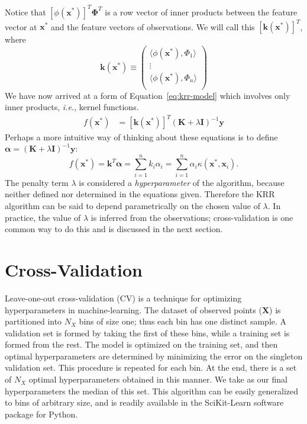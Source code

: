 \documentclass[11pt]{article}
\begin{document}
Notice that $[\phi(\mathbf{x}^*)]^T \boldsymbol{\Phi}^T$ is a row vector of
inner products between the feature vector at $\mathbf{x}^*$ and the feature
vectors of observations.
We will call this $[\mathbf{k}(\mathbf{x}^*)]^T$, where
\begin{equation}
	\mathbf{k}
	(\mathbf{x}^*)
\equiv
	\begin{pmatrix}
		\langle \phi(\mathbf{x}^*), \Phi_1 \rangle \\
		\vdots \\
		\langle \phi(\mathbf{x}^*), \Phi_n \rangle \\
	\end{pmatrix}
\end{equation}
We have now arrived at a form of Equation~\ref{eq:krr-model} which involves
only inner products, \textit{i.e.}, kernel functions.
\begin{align}
	f(\mathbf{x^*})
&=
	[\mathbf{k}
	(\mathbf{x}^*)]^T
	\left(
		\mathbf{K}
	+
		\lambda
		\mathbf{I}
	\right)^{-1}
	\mathbf{y}
\end{align}
Perhaps a more intuitive way of thinking about these equations is to define
$\boldsymbol{\alpha} = (\mathbf{K} + \lambda\mathbf{I})^{-1}\mathbf{y}$:
\begin{equation}
	f(\mathbf{x}^*)
=
	\mathbf{k}^T
	\mathbf{\alpha}
=
	\sum_{i=1}^n
	k_i
	\alpha_i
=
	\sum_{i=1}^n
	\alpha_i
	\kappa(\mathbf{x}^*, \mathbf{x}_i).
\end{equation}
The penalty term $\lambda$ is considered a {\it hyperparameter} of the
algorithm, because neither defined nor determined in the equations given.
Therefore the KRR algorithm can be said to depend parametrically on the chosen
value of $\lambda$.
In practice, the value of $\lambda$ is inferred from the observations;
cross-validation is one common way to do this and is discussed in the next
section.

\section*{Cross-Validation}

Leave-one-out cross-validation (CV) is a technique for optimizing
hyperparameters in machine-learning.
The dataset of observed points ($\mathbf{X}$) is partitioned into $N_X$ bins of
size one; thus each bin has one distinct sample.
A validation set is formed by taking the first of these bins, while a training
set is formed from the rest.
The model is optimized on the training set, and then optimal hyperparameters
are determined by minimizing the error on the singleton validation set.
This procedure is repeated for each bin.
At the end, there is a set of $N_X$ optimal hyperparameters obtained in this
manner. 
We take as our final hyperparameters the median of this set.
This algorithm can be easily generalized to bins of arbitrary size, and is
readily available in the SciKit-Learn software package for Python.





\end{document}
